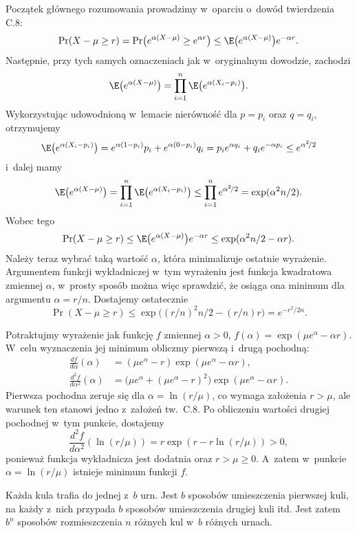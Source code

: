 Początek głównego rozumowania prowadzimy w~oparciu o~dowód twierdzenia C.8:
\[
	\Pr(X-\mu\ge r) = \Pr\bigl(e^{\alpha(X-\mu)}\ge e^{\alpha r}\bigr) \le \E\bigl(e^{\alpha(X-\mu)}\bigr)e^{-\alpha r}.
\]
Następnie, przy tych samych oznaczeniach jak w~oryginalnym dowodzie, zachodzi
\[
	\E\bigl(e^{\alpha(X-\mu)}\bigr) = \prod_{i=1}^n\E\bigl(e^{\alpha(X_i-p_i)}\bigr).
\]
Wykorzystując udowodnioną w~lemacie nierówność dla $p=p_i$ oraz $q=q_i$, otrzymujemy
\[
	\E\bigl(e^{\alpha(X_i-p_i)}\bigr) = e^{\alpha(1-p_i)}p_i+e^{\alpha(0-p_i)}q_i = p_ie^{\alpha q_i}+q_ie^{-\alpha p_i} \le e^{\alpha^2\!/2}
\]
i~dalej mamy
\[
	\E\bigl(e^{\alpha(X-\mu)}\bigr) = \prod_{i=1}^n\E\bigl(e^{\alpha(X_i-p_i)}\bigr) \le \prod_{i=1}^ne^{\alpha^2\!/2} = \exp(\alpha^2n/2).
\]
Wobec tego
\[
	\Pr(X-\mu\ge r) \le \E\bigl(e^{\alpha(X-\mu)}\bigr)e^{-\alpha r} \le \exp(\alpha^2n/2-\alpha r).
\]
Należy teraz wybrać taką wartość $\alpha$, która minimalizuje ostatnie wyrażenie.
Argumentem funkcji wykładniczej w~tym wyrażeniu jest funkcja kwadratowa zmiennej $\alpha$, w~prosty sposób można więc sprawdzić, że osiąga ona minimum dla argumentu $\alpha=r/n$.
Dostajemy ostatecznie
\[
	\Pr(X-\mu\ge r) \le \exp\bigl((r/n)^2n/2-(r/n)r\bigr) = e^{-r^2\!/{2n}}.
\]

\exercise %
Potraktujmy wyrażenie jak funkcję $f$ zmiennej $\alpha>0$, $f(\alpha)=\exp(\mu e^\alpha-\alpha r).$ W~celu wyznaczenia jej minimum obliczmy pierwszą i~drugą pochodną:
\begin{align*}
	\frac{df}{d\alpha}(\alpha) &= (\mu e^\alpha-r)\exp(\mu e^\alpha-\alpha r), \\
	\frac{d^2\!f}{d\alpha^2}(\alpha) &= \bigl(\mu e^\alpha+(\mu e^\alpha-r)^2\bigr)\exp(\mu e^\alpha-\alpha r).
\end{align*}
Pierwsza pochodna zeruje się dla $\alpha=\ln(r/\mu)$, co wymaga założenia $r>\mu$, ale warunek ten stanowi jedno z~założeń tw.\ C.8.
Po obliczeniu wartości drugiej pochodnej w~tym punkcie, dostajemy
\[
	\frac{d^2\!f}{d\alpha^2}(\ln(r/\mu)) = r\exp(r-r\ln(r/\mu)) > 0,
\]
ponieważ funkcja wykładnicza jest dodatnia oraz $r>\mu\ge0$.
A~zatem w~punkcie $\alpha=\ln(r/\mu)$ istnieje minimum funkcji $f$.

\problems


\subproblem %
Każda kula trafia do jednej z~$b$ urn.
Jest $b$ sposobów umieszczenia pierwszej kuli, na każdy z~nich przypada $b$ sposobów umieszczenia drugiej kuli itd.
Jest zatem $b^n$ sposobów rozmieszczenia $n$ różnych kul w~$b$ różnych urnach.

